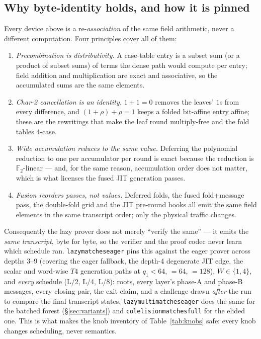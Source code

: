 \documentclass[11pt]{article}
\newcommand{\F}{\mathbb{F}}
\newcommand{\Ftwo}{\F_2}
\newcommand{\code}[1]{{\def\_{\textunderscore\allowbreak}\texttt{#1}}}
\theoremstyle{definition}
\begin{document}
\subsection{Why byte-identity holds, and how it is pinned}
\label{sec:identity}

Every device above is a re-\emph{association} of the same field
arithmetic, never a different computation.  Four principles cover all of
them:
\begin{enumerate}[leftmargin=2.2em, itemsep=2pt]
\item \emph{Precombination is distributivity.}  A case-table entry is a
  subset sum (or a product of subset sums) of terms the dense path would
  compute per entry; field addition and multiplication are exact and
  associative, so the accumulated sums are the same elements.
\item \emph{Char-2 cancellation is an identity.}  $1 + 1 = 0$ removes the
  leaves' $1$s from every difference, and $(1+\rho) + \rho = 1$ keeps a
  folded bit-affine entry affine; these are the rewritings that make the
  leaf round multiply-free and the fold tables 4-case.
\item \emph{Wide accumulation reduces to the same value.}  Deferring the
  polynomial reduction to one per accumulator per round is exact because
  the reduction is $\Ftwo$-linear --- and, for the same reason,
  accumulation order does not matter, which is what licenses the fused
  JIT generation passes.
\item \emph{Fusion reorders passes, not values.}  Deferred folds, the
  fused fold+message pass, the double-fold grid and the JIT
  pre-round hooks all emit the same field elements in the same
  transcript order; only the physical traffic changes.
\end{enumerate}
Consequently the lazy prover does not merely ``verify the same'' --- it
emits the \emph{same transcript}, byte for byte, so the verifier and the
proof codec never learn which schedule ran.
\code{lazy\_matches\_eager} pins this against the eager prover across
depths 3--9 (covering the eager fallback, the depth-4 degenerate JIT
edge, the scalar and word-wise $T4$ generation paths at
$q_1 < 64$, $= 64$, $= 128$), $W \in \{1, 4\}$, and \emph{every}
schedule (L/2, L/4, L/8): roots, every layer's phase-A and phase-B
messages, every closing pair, the exit claim, and a challenge drawn
\emph{after} the run to compare the final transcript states.
\code{lazy\_multi\_matches\_eager} does the same for the batched forest
(\S\ref{sec:variants}) and \code{col\_elision\_matches\_full} for the
elided one.  This is what makes the knob inventory of
Table~\ref{tab:knobs} safe: every knob changes scheduling, never
semantics.
\end{document}

